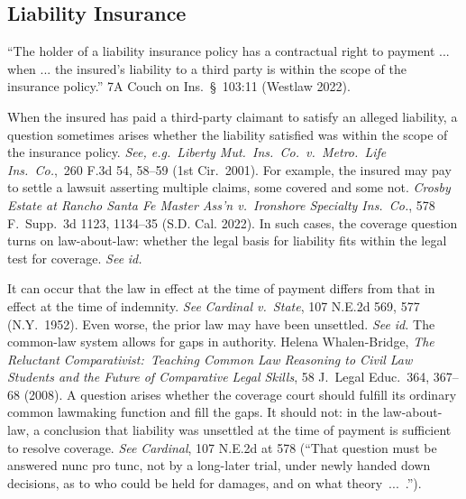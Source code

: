 \documentclass[
  12pt,
  letterpaper,
]{scrartcl}
\begin{document}
\subsection{Liability Insurance}

``The holder of a liability insurance policy has a contractual right to payment ... when ... the insured's liability to a third party is within the scope of the insurance policy.'' 7A Couch on Ins.~§~103:11 (Westlaw 2022).

When the insured has paid a third-party claimant to satisfy an alleged
liability, a question sometimes arises whether the liability satisfied was
within the scope of the insurance policy. \textit{See, e.g.}~\textit{Liberty
Mut.~Ins.~Co.~v.~Metro.~Life Ins.~Co.},~260 F.3d 54, 58--59 (1st Cir.~2001).
For example, the insured may pay to settle a lawsuit asserting multiple claims,
some covered and some not. \textit{Crosby Estate at Rancho Santa Fe Master
Ass'n v.~Ironshore Specialty Ins.~Co.}, 578 F.~Supp.~3d 1123, 1134--35 (S.D.
Cal. 2022). In such cases, the coverage question turns on law-about-law:
whether the legal basis for liability fits within the legal test for coverage.
\textit{See} \textit{id.}

It can occur that the law in effect at the time of payment differs from that in
effect at the time of indemnity. \textit{See} \textit{Cardinal v.~State}, 107
N.E.2d 569, 577 (N.Y.~1952). Even worse, the prior law may have been unsettled.
\textit{See} \textit{id.} The common-law system allows for gaps in authority.
Helena Whalen-Bridge, \textit{The Reluctant Comparativist:~Teaching Common Law
Reasoning to Civil Law Students and the Future of Comparative Legal Skills}, 58
J.~Legal Educ.~364, 367--68 (2008). A question arises whether the coverage
court should fulfill its ordinary common lawmaking function and fill the gaps.
It should not: in the law-about-law, a conclusion that liability was unsettled
at the time of payment is sufficient to resolve coverage. \textit{See}
\textit{Cardinal}, 107 N.E.2d at 578 (``That question must be answered nunc pro
tunc, not by a long-later trial, under newly handed down decisions, as to who
could be held for damages, and on what theory~...~.'').
\end{document}
